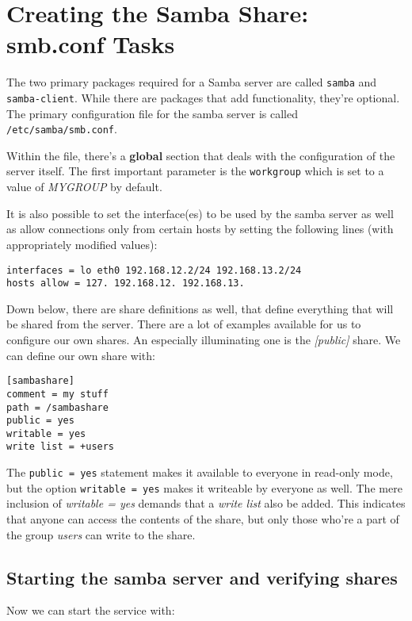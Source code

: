 \section{Creating the Samba Share: smb.conf Tasks}
The two primary packages required for a Samba server are called \verb|samba| and \verb|samba-client|. While there are packages that add functionality, they're optional. The primary configuration file for the samba server is called \verb|/etc/samba/smb.conf|. 

Within the file, there's a \textbf{global} section that deals with the configuration of the server itself. The first important parameter is the \verb|workgroup| which is set to a value of \textit{MYGROUP} by default. 

It is also possible to set the interface(es) to be used by the samba server as well as allow connections only from certain hosts by setting the following lines (with appropriately modified values):

\vspace{-15pt}
\begin{verbatim}
interfaces = lo eth0 192.168.12.2/24 192.168.13.2/24
hosts allow = 127. 192.168.12. 192.168.13.
\end{verbatim}
\vspace{-10pt}	

\noindent
Down below, there are share definitions as well, that define everything that will be shared from the server. There are a lot of examples available for us to configure our own shares. An especially illuminating one is the \textit{[public]} share. We can define our own share with:

\vspace{-15pt}
\begin{verbatim}
[sambashare]
comment = my stuff
path = /sambashare
public = yes
writable = yes
write list = +users
\end{verbatim}
\vspace{-10pt}	

\noindent
The \verb|public = yes| statement makes it available to everyone in read-only mode, but the option \verb|writable = yes| makes it writeable by everyone as well. The mere inclusion of \textit{writable = yes} demands that a \textit{write list} also be added. This indicates that anyone can access the contents of the share, but only those who're a part of the group \textit{users} can write to the share. 

\subsection{Starting the samba server and verifying shares}
Now we can start the service with:

